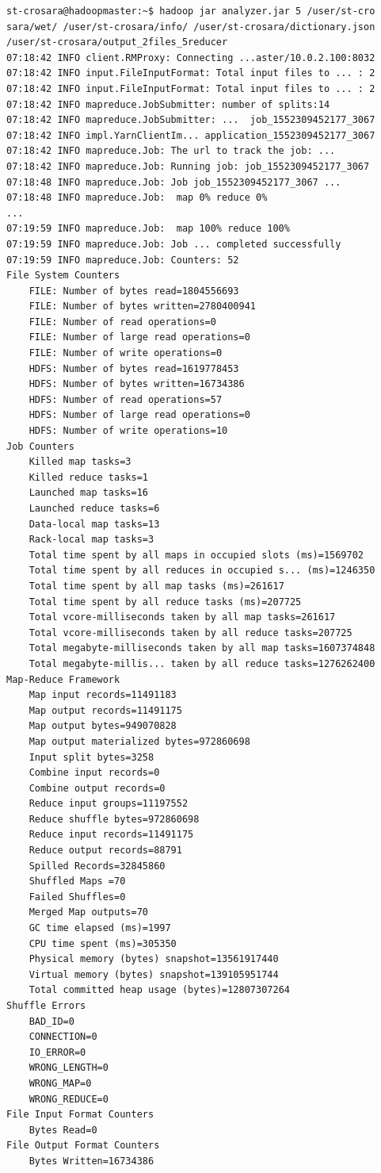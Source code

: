 \documentclass{article}
\begin{document}
\begin{verbatim}
st-crosara@hadoopmaster:~$ hadoop jar analyzer.jar 5 /user/st-cro
sara/wet/ /user/st-crosara/info/ /user/st-crosara/dictionary.json
/user/st-crosara/output_2files_5reducer
07:18:42 INFO client.RMProxy: Connecting ...aster/10.0.2.100:8032
07:18:42 INFO input.FileInputFormat: Total input files to ... : 2
07:18:42 INFO input.FileInputFormat: Total input files to ... : 2
07:18:42 INFO mapreduce.JobSubmitter: number of splits:14
07:18:42 INFO mapreduce.JobSubmitter: ...  job_1552309452177_3067
07:18:42 INFO impl.YarnClientIm... application_1552309452177_3067
07:18:42 INFO mapreduce.Job: The url to track the job: ...
07:18:42 INFO mapreduce.Job: Running job: job_1552309452177_3067
07:18:48 INFO mapreduce.Job: Job job_1552309452177_3067 ...
07:18:48 INFO mapreduce.Job:  map 0% reduce 0%
...
07:19:59 INFO mapreduce.Job:  map 100% reduce 100%
07:19:59 INFO mapreduce.Job: Job ... completed successfully
07:19:59 INFO mapreduce.Job: Counters: 52
File System Counters
    FILE: Number of bytes read=1804556693
    FILE: Number of bytes written=2780400941
    FILE: Number of read operations=0
    FILE: Number of large read operations=0
    FILE: Number of write operations=0
    HDFS: Number of bytes read=1619778453
    HDFS: Number of bytes written=16734386
    HDFS: Number of read operations=57
    HDFS: Number of large read operations=0
    HDFS: Number of write operations=10
Job Counters 
    Killed map tasks=3
    Killed reduce tasks=1
    Launched map tasks=16
    Launched reduce tasks=6
    Data-local map tasks=13
    Rack-local map tasks=3
    Total time spent by all maps in occupied slots (ms)=1569702
    Total time spent by all reduces in occupied s... (ms)=1246350
    Total time spent by all map tasks (ms)=261617
    Total time spent by all reduce tasks (ms)=207725
    Total vcore-milliseconds taken by all map tasks=261617
    Total vcore-milliseconds taken by all reduce tasks=207725
    Total megabyte-milliseconds taken by all map tasks=1607374848
    Total megabyte-millis... taken by all reduce tasks=1276262400
Map-Reduce Framework
    Map input records=11491183
    Map output records=11491175
    Map output bytes=949070828
    Map output materialized bytes=972860698
    Input split bytes=3258
    Combine input records=0
    Combine output records=0
    Reduce input groups=11197552
    Reduce shuffle bytes=972860698
    Reduce input records=11491175
    Reduce output records=88791
    Spilled Records=32845860
    Shuffled Maps =70
    Failed Shuffles=0
    Merged Map outputs=70
    GC time elapsed (ms)=1997
    CPU time spent (ms)=305350
    Physical memory (bytes) snapshot=13561917440
    Virtual memory (bytes) snapshot=139105951744
    Total committed heap usage (bytes)=12807307264
Shuffle Errors
    BAD_ID=0
    CONNECTION=0
    IO_ERROR=0
    WRONG_LENGTH=0
    WRONG_MAP=0
    WRONG_REDUCE=0
File Input Format Counters 
    Bytes Read=0
File Output Format Counters 
    Bytes Written=16734386
\end{verbatim}
\end{document}
